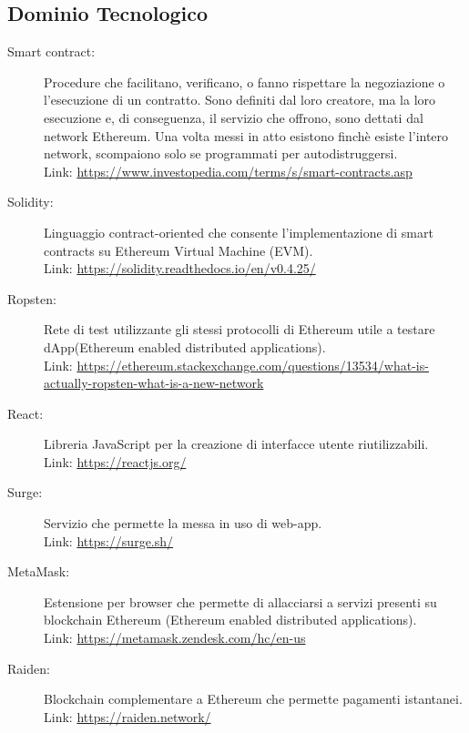 \subsection{Dominio Tecnologico}
\begin{description}
\item[Smart contract:] Procedure che facilitano, verificano, o fanno rispettare la negoziazione o l'esecuzione di un contratto.
Sono definiti dal loro creatore, ma la loro esecuzione e, di conseguenza, il servizio che offrono, sono dettati dal network Ethereum.
Una volta messi in atto esistono finchè esiste l'intero network, scompaiono solo se programmati per autodistruggersi.\\
Link: \href{https://www.investopedia.com/terms/s/smart-contracts.asp}{https://www.investopedia.com/terms/s/smart-contracts.asp}

\item[Solidity:] Linguaggio contract-oriented che consente l'implementazione di smart contracts su Ethereum Virtual Machine (EVM).\\
Link: \href{https://solidity.readthedocs.io/en/v0.4.25/}{https://solidity.readthedocs.io/en/v0.4.25/}

\item[Ropsten:] Rete di test utilizzante gli stessi protocolli di Ethereum utile a testare dApp(Ethereum enabled distributed applications).\\
Link: \href{https://ethereum.stackexchange.com/questions/13534/what-is-actually-ropsten-what-is-a-new-network}{https://ethereum.stackexchange.com/questions/13534/what-is-actually-ropsten-what-is-a-new-network}

\item[React:] Libreria JavaScript per la creazione di interfacce utente riutilizzabili.\\
Link: \href{https://reactjs.org/}{https://reactjs.org/}

\item[Surge:] Servizio che permette la messa in uso di web-app.\\
Link: \href{https://surge.sh/}{https://surge.sh/}

\item[MetaMask:] Estensione per browser che permette di allacciarsi a servizi presenti su blockchain Ethereum (Ethereum enabled distributed applications).\\
Link: \href{https://metamask.zendesk.com/hc/en-us}{https://metamask.zendesk.com/hc/en-us}

\item[Raiden:] Blockchain complementare a Ethereum che permette pagamenti istantanei.\\
Link: \href{https://raiden.network/}{https://raiden.network/}
\end{description}

